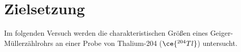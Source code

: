 \section{Zielsetzung}

Im folgenden Versuch werden die charakteristischen Größen eines Geiger-Müllerzählrohrs an einer Probe von Thalium-204 ($\ce{^{204}_{}Tl}$) untersucht.